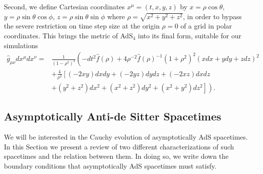 \documentclass[a4paper,11pt]{article}
\numberwithin{equation}{section}
\begin{document}
Second, we define Cartesian coordinates $x^\mu=(t,x,y,z)$ by $x=\rho\cos\theta$, $y=\rho\sin\theta\cos\phi$, $z=\rho\sin\theta\sin\phi$ where $\rho=\sqrt{x^2+y^2+z^2}$, in order to bypass the severe restriction on time step size at the origin $\rho=0$ of a grid in polar coordinates. 
This brings the metric of AdS$_4$ into its final form, suitable for our simulations
\begin{eqnarray}\label{eqn:ads4_final}
\hat{g}_{\mu\nu}dx^{\mu}dx^{\nu}=&\frac{1}{\left(1-\rho^2\right)^2 }\left( -dt^2 \hat{f}(\rho) +4\rho^{-2}\hat{f}(\rho)^{-1} \left(1+\rho^2\right)^2 (x dx + y dy + z dz)^2 \right. \nonumber \\
&+\frac{4}{\rho^2} \left[\left(-2 x y\right) dx dy + \left(- 2 y z\right) dy dz + \left(- 2 x z\right) dx dz \right. \nonumber \\
&\left. \left. + \left(y^2+z^2\right) dx^2 + \left(x^2+z^2\right) dy^2 + \left(x^2+y^2\right) dz^2 \right] \right).
\end{eqnarray}


\subsection{Asymptotically Anti-de Sitter Spacetimes}\label{subsec:asyAdS}

We will be interested in the Cauchy evolution of asymptotically AdS spacetimes. In this Section we present a review of two different characterizations of such spacetimes and the relation between them. In doing so, we write down the boundary conditions that asymptotically AdS spacetimes must satisfy.



\end{document}
